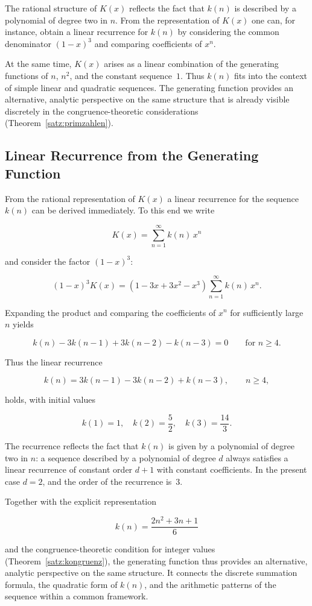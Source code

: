 \begin{remark}
The rational structure of $K(x)$ reflects the fact that $k(n)$ is described
by a polynomial of degree two in $n$. From the representation of $K(x)$ one
can, for instance, obtain a linear recurrence for $k(n)$ by considering the
common denominator $(1-x)^{3}$ and comparing coefficients of $x^{n}$.

At the same time, $K(x)$ arises as a linear combination of the generating
functions of $n$, $n^{2}$, and the constant sequence~$1$. Thus $k(n)$ fits
into the context of simple linear and quadratic sequences. The
generating function provides an alternative, analytic perspective on the same
structure that is already visible discretely in the congruence-theoretic
considerations (Theorem~\ref{satz:primzahlen}).
\end{remark}

\subsection{Linear Recurrence from the Generating Function}

From the rational representation of $K(x)$ a linear recurrence for the
sequence $k(n)$ can be derived immediately. To this end we write


\[
  K(x) = \sum_{n=1}^{\infty} k(n)\,x^{n}
\]


and consider the factor $(1-x)^{3}$:


\[
  (1-x)^{3} K(x)
  = (1 - 3x + 3x^{2} - x^{3}) \sum_{n=1}^{\infty} k(n)\,x^{n}.
\]


Expanding the product and comparing the coefficients of $x^{n}$ for
sufficiently large $n$ yields


\[
  k(n) - 3k(n-1) + 3k(n-2) - k(n-3) = 0 \qquad \text{for } n \ge 4.
\]


Thus the linear recurrence


\[
  k(n) = 3k(n-1) - 3k(n-2) + k(n-3), \qquad n \ge 4,
\]


holds, with initial values


\[
  k(1) = 1,\quad k(2) = \frac{5}{2},\quad k(3) = \frac{14}{3}.
\]



\begin{remark}
The recurrence reflects the fact that $k(n)$ is given by a polynomial of
degree two in $n$: a sequence described by a polynomial of degree $d$
always satisfies a linear recurrence of constant order $d+1$ with constant
coefficients. In the present case $d=2$, and the order of the recurrence
is~$3$.

Together with the explicit representation


\[
  k(n) = \frac{2n^{2} + 3n + 1}{6}
\]


and the congruence-theoretic condition for integer values
(Theorem~\ref{satz:kongruenz}), the generating function thus provides an
alternative, analytic perspective on the same structure. It connects the
discrete summation formula, the quadratic form of $k(n)$, and the
arithmetic patterns of the sequence within a common framework.
\end{remark}
